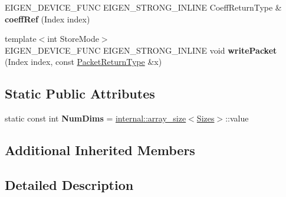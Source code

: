 \begin{DoxyCompactItemize}
\item 
\mbox{\label{struct_eigen_1_1_tensor_evaluator_3_01_tensor_slicing_op_3_01_start_indices_00_01_sizes_00_01_arg_type_01_4_00_01_device_01_4_a3efd34c3be7ab542192f902cafed8eeb}} 
E\+I\+G\+E\+N\+\_\+\+D\+E\+V\+I\+C\+E\+\_\+\+F\+U\+NC E\+I\+G\+E\+N\+\_\+\+S\+T\+R\+O\+N\+G\+\_\+\+I\+N\+L\+I\+NE Coeff\+Return\+Type \& {\bfseries coeff\+Ref} (Index index)
\item 
\mbox{\label{struct_eigen_1_1_tensor_evaluator_3_01_tensor_slicing_op_3_01_start_indices_00_01_sizes_00_01_arg_type_01_4_00_01_device_01_4_a835ccea753f607886a3f62cae2e743dc}} 
{\footnotesize template$<$int Store\+Mode$>$ }\\E\+I\+G\+E\+N\+\_\+\+D\+E\+V\+I\+C\+E\+\_\+\+F\+U\+NC E\+I\+G\+E\+N\+\_\+\+S\+T\+R\+O\+N\+G\+\_\+\+I\+N\+L\+I\+NE void {\bfseries write\+Packet} (Index index, const \hyperlink{group___sparse_core___module}{Packet\+Return\+Type} \&x)
\end{DoxyCompactItemize}
\subsection*{Static Public Attributes}
\begin{DoxyCompactItemize}
\item 
\mbox{\label{struct_eigen_1_1_tensor_evaluator_3_01_tensor_slicing_op_3_01_start_indices_00_01_sizes_00_01_arg_type_01_4_00_01_device_01_4_ac2ffd4662a0b826f37ab26ce9ae652ee}} 
static const int {\bfseries Num\+Dims} = \hyperlink{struct_eigen_1_1internal_1_1array__size}{internal\+::array\+\_\+size}$<$\hyperlink{struct_eigen_1_1_sizes}{Sizes}$>$\+::value
\end{DoxyCompactItemize}
\subsection*{Additional Inherited Members}


\subsection{Detailed Description}
